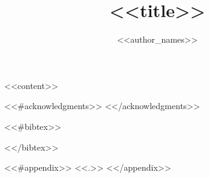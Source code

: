 \documentclass[<<class_options>><<^class_options>>journal<</class_options>>]{vgtc}
\title{<<title>>}
\author{
<<author_names>>
}
\begin{document}


\maketitle

<<content>>

<<#acknowledgments>>
<</acknowledgments>>

<<#bibtex>>

%
%
%

<</bibtex>>

<<#appendix>>
\appendix
<<.>>
<</appendix>>
\end{document}
